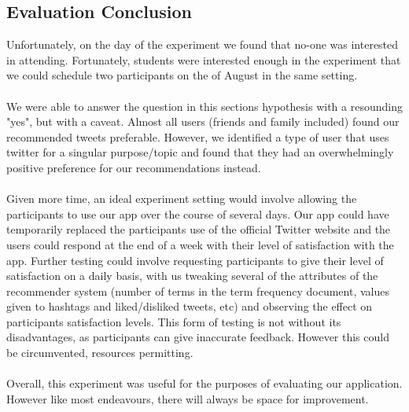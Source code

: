 \documentclass{article}
\begin{document}
\subsection{Evaluation Conclusion} %
Unfortunately, on the day of the experiment we found that no-one was interested in attending. Fortunately, students were interested enough in the experiment that we could schedule two participants on the  of August in the same setting. 
\\\\
We were able to answer the question in this sections hypothesis with a resounding "yes", but with a caveat. Almost all users (friends and family included) found our recommended tweets preferable. However, we identified a type of user that uses twitter for a singular purpose/topic and found that they had an overwhelmingly positive preference for our recommendations instead.
\\\\
Given more time, an ideal experiment setting would involve allowing the participants to use our app over the course of several days. Our app could have temporarily replaced the participants use of the official Twitter website and the users could respond at the end of a week with their level of satisfaction with the app. Further testing could involve requesting participants to give their level of satisfaction on a daily basis, with us tweaking several of the attributes of the recommender system (number of terms in the term frequency document, values given to hashtags and liked/disliked tweets, etc) and observing the effect on participants satisfaction levels. This form of testing is not without its disadvantages, as participants can give inaccurate feedback. However this could be circumvented, resources permitting.
\\\\
Overall, this experiment was useful for the purposes of evaluating our application. However like most endeavours, there will always be space for improvement. 
\end{document}
